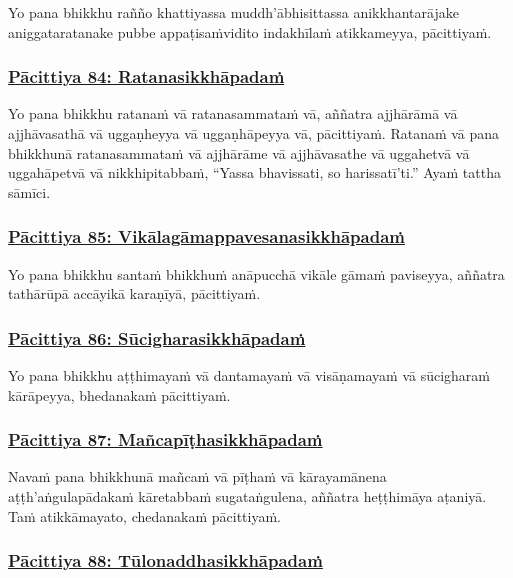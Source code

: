 Yo pana bhikkhu rañño khattiyassa muddh'ābhisittassa anikkhantarājake aniggataratanake pubbe appaṭisaṁvidito indakhīlaṁ atikkameyya, pācittiyaṁ.



\subsubsection*{\hyperref[exp84]{Pācittiya 84: Ratanasikkhāpadaṁ}}
\label{pac84}

Yo pana bhikkhu ratanaṁ vā ratanasammataṁ vā, aññatra ajjhārāmā vā ajjhāvasathā vā uggaṇheyya vā uggaṇhāpeyya vā, pācittiyaṁ. Ratanaṁ vā pana bhikkhunā ratanasammataṁ vā ajjhārāme vā ajjhāvasathe vā uggahetvā vā uggahāpetvā vā nikkhipitabbaṁ, ``Yassa bhavissati, so harissatī'ti.'' Ayaṁ tattha sāmīci.



\subsubsection*{\hyperref[exp85]{Pācittiya 85: Vikālagāmappavesanasikkhāpadaṁ}}
\label{pac85}

Yo pana bhikkhu santaṁ bhikkhuṁ anāpucchā vikāle gāmaṁ paviseyya, aññatra tathārūpā accāyikā karaṇīyā, pācittiyaṁ.



\subsubsection*{\hyperref[exp86]{Pācittiya 86: Sūcigharasikkhāpadaṁ}}
\label{pac86}

Yo pana bhikkhu aṭṭhimayaṁ vā dantamayaṁ vā visāṇamayaṁ vā sūcigharaṁ kārāpeyya, bhedanakaṁ pācittiyaṁ.



\subsubsection*{\hyperref[exp87]{Pācittiya 87: Mañcapīṭhasikkhāpadaṁ}}
\label{pac87}

Navaṁ pana bhikkhunā mañcaṁ vā pīṭhaṁ vā kārayamānena aṭṭh'aṅgulapādakaṁ kāretabbaṁ sugataṅgulena, aññatra heṭṭhimāya aṭaniyā. Taṁ atikkāmayato, chedanakaṁ pācittiyaṁ.



\subsubsection*{\hyperref[exp88]{Pācittiya 88: Tūlonaddhasikkhāpadaṁ}}
\label{pac88}

